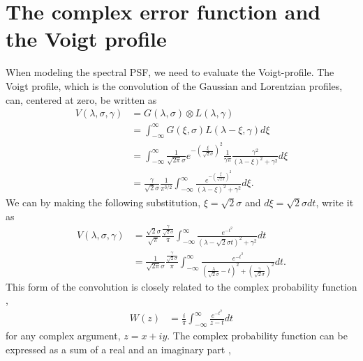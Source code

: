 \documentclass[longauth]{aa}    %
\begin{document}
\section{The complex error function and the Voigt profile} \label{voigt}
When modeling the spectral PSF, we need to evaluate the Voigt-profile. The Voigt profile, which is the convolution of the Gaussian and Lorentzian profiles, can, centered at zero, be written as \citep{pagnini2010} 
\begin{equation} 
\begin{split}
V(\lambda,\sigma, \gamma)  
& = G(\lambda, \sigma)  \otimes L(\lambda, \gamma) \\
& = \int_{-\infty}^{\infty} G(\xi, \sigma) L(\lambda - \xi, \gamma) d\xi \\
& = \int_{-\infty}^{\infty} \frac{1}{\sqrt{2 \pi} \sigma} e^{- \left( \frac{\xi}{\sqrt{2} \sigma}  \right)^2 } \frac{1}{\gamma \pi} \frac{\gamma^2}{(\lambda - \xi)^2 + \gamma^2} d\xi \\
& = \frac{\gamma}{\sqrt{2} \sigma} \frac{1}{ \pi^{3/2}}   \int_{-\infty}^{\infty} \frac{e^{- \left( \frac{\xi}{\sqrt{2} \sigma}  \right)^2 }}{(\lambda - \xi)^2 + \gamma^2} d\xi.
\end{split}
\end{equation}
We can by making the following substitution, $\xi = \sqrt{2} \sigma$ and $d\xi = \sqrt{2} \sigma dt$, write it as
\begin{equation} 
\begin{split}
V(\lambda,\sigma, \gamma)  
& =  \frac{\sqrt{2} \sigma}{ \sqrt{{\pi}}} \frac{\frac{\gamma}{\sqrt{2} \sigma}}{\pi}  \int_{-\infty}^{\infty} \frac{e^{- t^2 }}{(\lambda - \sqrt{2} \sigma t)^2 + \gamma^2} dt \\
& = \frac{1}{\sqrt{2 \pi} \sigma}  \frac{\frac{\gamma}{\sqrt{2} \sigma}}{\pi}  \int_{-\infty}^{\infty} \frac{e^{- t^2 }}{\left(\frac{\lambda}{\sqrt{2} \sigma} -  t\right)^2 + \left(\frac{\gamma}{\sqrt{2} \sigma}\right)^2} dt.	
\end{split}
\end{equation}
This form of the convolution is closely related to the complex probability function \citep{letchworth2007, abrarov2015a},
\begin{equation} 
\begin{split}
W(z)  
& = \frac{i}{\pi} \int_{-\infty}^{\infty} \frac{e^{-t^2}}{z - t}  dt
\end{split}
\end{equation}
for any complex argument, $z = x + iy$. The complex probability function can be expressed as a sum of a real and an imaginary part \citep{benner1995, abrarov2015b},
\end{document}

